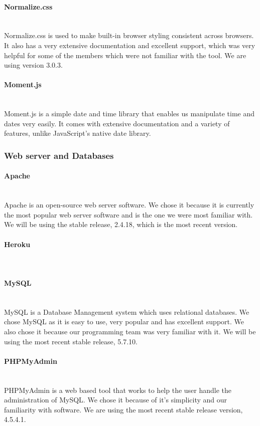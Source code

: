 \documentclass[12pt]{article}
\begin{document}
\paragraph*{Normalize.css}~\\
Normalize.css is used to make built-in browser styling consistent across browsers. It also has a very extensive documentation and excellent support, which was very helpful for some of the members which were not familiar with the tool. We are using version 3.0.3.
%
\paragraph*{Moment.js}~\\
Moment.js is a simple date and time library that enables us manipulate time and dates very easily. It comes with extensive documentation and a variety of features, unlike JavaScript's native date library.
%
%
%
\subsubsection{Web server and Databases} \label{webanddata}
\paragraph*{Apache}~\\
Apache is an open-source web server software. We chose it because it is currently the most popular web server software and is the one we were most familiar with. We will be using the stable release, 2.4.18, which is the most recent version.
%
\paragraph*{Heroku}~\\
%
\paragraph*{MySQL}~\\
MySQL is a Database Management system which uses relational databases. We chose MySQL as it is easy to use, very popular and has excellent support. We also chose it because our programming team was very familiar with it. We will be using the most recent stable release, 5.7.10.
%
\paragraph*{PHPMyAdmin}~\\
PHPMyAdmin is a web based tool that works to help the user handle the administration of MySQL. We chose it because of it's simplicity and our familiarity with software. We are using the most recent stable release version, 4.5.4.1.
%
\end{document}
